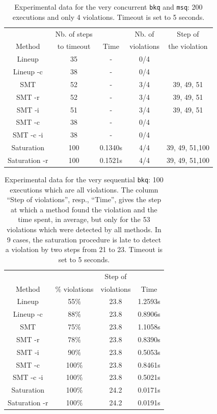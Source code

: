 \begin{table}[t]
  \footnotesize
  \centering
  \setlength{\tabcolsep}{1.8mm}
  \begin{tabular}{ccccc}
   & Nb. of steps  & & Nb. of & Step of  \\
   Method & to timeout & Time & violations & the violation \\
  \hline
  Lineup & 35 & - & 0/4 \\
  Lineup -c & 38 & - & 0/4 \\
  SMT & 52 & - & 3/4 & 39, 49, 51\\
  SMT -r & 52 & - & 3/4 & 39, 49, 51\\
  SMT -i & 51 & - & 3/4 & 39, 49, 51\\
  SMT -c & 38 & - & 0/4 \\
  SMT -c -i & 38 & - & 0/4 \\
  Saturation & 100 & 0.1340s & 4/4 & 39, 49, 51,100\\
  Saturation -r  & 100 & 0.1521s & 4/4 &39, 49, 51,100 
  \end{tabular} 
  \caption{Experimental data for the very concurrent {\tt bkq} and {\tt msq}: 200 executions and only 4 violations.
  Timeout is set to 5 seconds.
    }
  \label{tab:exp:concur}
\end{table}


\begin{table}[t]
  \footnotesize
  \centering
  \setlength{\tabcolsep}{1.8mm}
  \begin{tabular}{cccc}
   	        & 	                     & Step of     \\
   Method & $\%$ violations  & violations & Time \\
  \hline
  Lineup & 55$\%$ & 23.8 & 1.2593s \\
  Lineup -c & 88$\%$ & 23.8 & 0.8906s \\
  SMT & 75$\%$ & 23.8 & 1.1058s \\
  SMT -r & 78$\%$ & 23.8 & 0.8390s\\
  SMT -i & 90$\%$ & 23.8 & 0.5053s\\
  SMT -c & 100$\%$ & 23.8 & 0.8461s \\
  SMT -c -i & 100$\%$ & 23.8 & 0.5021s \\
  Saturation & 100$\%$ & 24.2 & 0.0171s\\
  Saturation -r  & 100$\%$ & 24.2 & 0.0191s
  \end{tabular} 
  \caption{Experimental data for the very sequential {\tt bkq}: 100 executions which are all violations. The column ``Step of violations'', resp., ``Time'',
  gives the step at which a method found the violation and the time spent, in average, but only for the 53 violations
  which were detected by all methods. In 9 cases, the saturation procedure is late to detect a violation by two steps
  from 21 to 23. Timeout is set to 5 seconds.
    }
  \label{tab:exp:sec}
\end{table}



